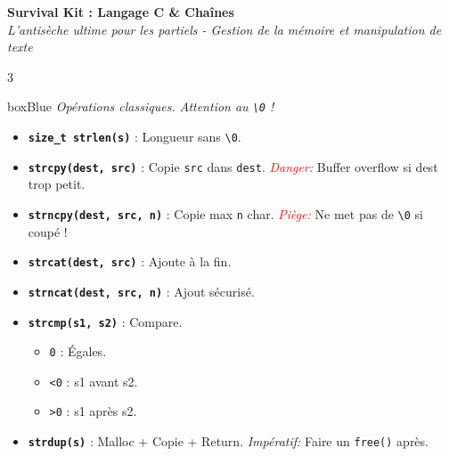 \documentclass[10pt,landscape,a4paper]{article}
\begin{document}
\begin{center}
    {\Huge \sffamily \textbf{Survival Kit : Langage C \& Chaînes}} \\
    {\small \textit{L'antisèche ultime pour les partiels - Gestion de la mémoire et manipulation de texte}}
\end{center}

\begin{multicols*}{3}

\begin{mybox}{boxBlue}
    \textit{Opérations classiques. Attention au \texttt{\textbackslash0} !}
    \begin{itemize}[leftmargin=*, noitemsep]
        \item \textbf{\texttt{size\_t strlen(s)}} : Longueur sans \texttt{\textbackslash0}.
        \item \textbf{\texttt{strcpy(dest, src)}} : Copie \texttt{src} dans \texttt{dest}.
            \textit{\textcolor{red}{Danger:}} Buffer overflow si dest trop petit.
        \item \textbf{\texttt{strncpy(dest, src, n)}} : Copie max \texttt{n} char.
            \textit{\textcolor{red}{Piège:}} Ne met pas de \texttt{\textbackslash0} si coupé !
        \item \textbf{\texttt{strcat(dest, src)}} : Ajoute à la fin.
        \item \textbf{\texttt{strncat(dest, src, n)}} : Ajout sécurisé.
        \item \textbf{\texttt{strcmp(s1, s2)}} : Compare.
            \begin{itemize}
                \item \texttt{0} : Égales.
                \item \texttt{<0} : s1 avant s2.
                \item \texttt{>0} : s1 après s2.
            \end{itemize}
        \item \textbf{\texttt{strdup(s)}} : Malloc + Copie + Return.
            \textit{\textcolor{boxRed}{Impératif:}} Faire un \texttt{free()} après.
    \end{itemize}
\end{mybox}


\end{multicols*}
\end{document}
